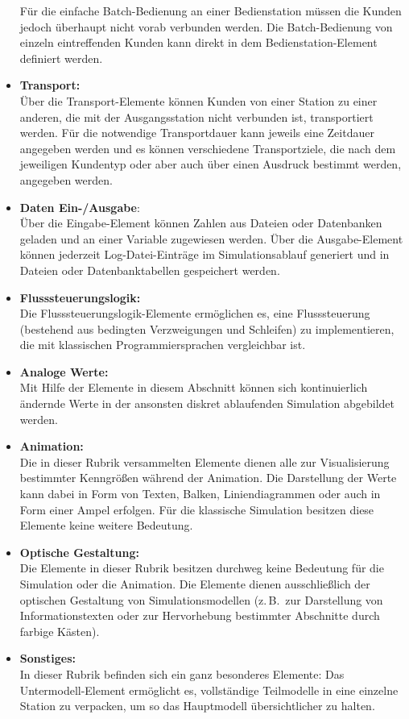 \documentclass[deutsch]{svmono}
\begin{document}
\begin{itemize}
Für die einfache Batch-Bedienung an einer Bedienstation müssen die Kunden jedoch überhaupt nicht vorab verbunden werden. Die Batch-Bedienung von einzeln eintreffenden Kunden kann direkt in dem Bedienstation-Element definiert werden.
\item
\textbf{Transport:}\\
Über die Transport-Elemente können Kunden von einer Station zu einer anderen, die mit der Ausgangsstation nicht verbunden ist, transportiert werden. Für die notwendige Transportdauer kann jeweils eine Zeitdauer angegeben werden und es können verschiedene Transportziele, die nach dem jeweiligen Kundentyp oder aber auch über einen Ausdruck bestimmt werden, angegeben werden.
\item
\textbf{Daten Ein-/Ausgabe}:\\
Über die Eingabe-Element können Zahlen aus Dateien oder Datenbanken geladen und an einer Variable zugewiesen werden.
Über die Ausgabe-Element können jederzeit Log-Datei-Einträge im Simulationsablauf generiert und in Dateien oder Datenbanktabellen gespeichert werden.
\item
\textbf{Flusssteuerungslogik:}\\
Die Flusssteuerungslogik-Elemente ermöglichen es, eine Flusssteuerung (bestehend aus bedingten Verzweigungen und Schleifen)
zu implementieren, die mit klassischen Programmiersprachen vergleichbar ist.
\item
\textbf{Analoge Werte:}\\
Mit Hilfe der Elemente in diesem Abschnitt können sich kontinuierlich ändernde Werte in der ansonsten diskret
ablaufenden Simulation abgebildet werden.
\item
\textbf{Animation:}\\
Die in dieser Rubrik versammelten Elemente dienen alle zur Visualisierung bestimmter Kenngrößen während der Animation. Die Darstellung der Werte kann dabei in Form von Texten, Balken, Liniendiagrammen oder auch in Form einer Ampel erfolgen. Für die klassische Simulation besitzen diese Elemente keine weitere Bedeutung.
\item
\textbf{Optische Gestaltung:}\\
Die Elemente in dieser Rubrik besitzen durchweg keine Bedeutung für die Simulation oder die Animation. Die Elemente dienen ausschließlich der optischen Gestaltung von Simulationsmodellen (z.\,B.\ zur Darstellung von Informationstexten oder zur Hervorhebung bestimmter Abschnitte durch farbige Kästen).
\item
\textbf{Sonstiges:}\\
In dieser Rubrik befinden sich ein ganz besonderes Elemente: Das Untermodell-Element ermöglicht es, vollständige Teilmodelle in eine einzelne Station zu verpacken, um so das Hauptmodell übersichtlicher zu halten.
\end{itemize}
\end{document}
